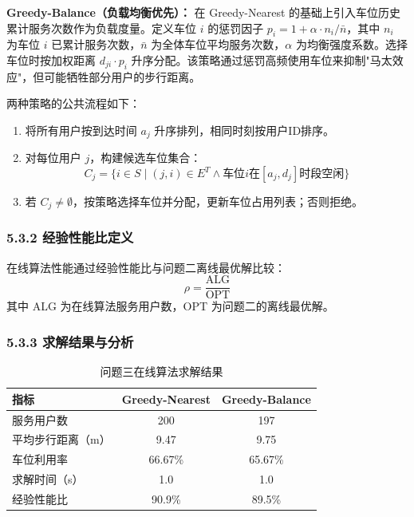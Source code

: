 \documentclass{ctexart}
\begin{document}
\textbf{Greedy-Balance（负载均衡优先）：} 在 Greedy-Nearest 的基础上引入车位历史累计服务次数作为负载度量。定义车位 $i$ 的惩罚因子 $p_i = 1 + \alpha \cdot n_i / \bar{n}$，其中 $n_i$ 为车位 $i$ 已累计服务次数，$\bar{n}$ 为全体车位平均服务次数，$\alpha$ 为均衡强度系数。选择车位时按加权距离 $d_{ji} \cdot p_i$ 升序分配。该策略通过惩罚高频使用车位来抑制"马太效应"，但可能牺牲部分用户的步行距离。

两种策略的公共流程如下：

\begin{enumerate}
  \item 将所有用户按到达时间 $a_j$ 升序排列，相同时刻按用户ID排序。
  \item 对每位用户 $j$，构建候选车位集合：
        \begin{equation}
          C_j = \{i\in S \mid (j,i)\in E^T \wedge \text{车位} i \text{在} [a_j,d_j] \text{时段空闲}\} \label{eq:candidate}
        \end{equation}
  \item 若 $C_j \neq \emptyset$，按策略选择车位并分配，更新车位占用列表；否则拒绝。
\end{enumerate}

\subsubsection*{5.3.2 经验性能比定义}

在线算法性能通过经验性能比与问题二离线最优解比较：
\begin{equation}
  \rho = \frac{\text{ALG}}{\text{OPT}} \label{eq:ratio}
\end{equation}
其中 ALG 为在线算法服务用户数，OPT 为问题二的离线最优解。

\subsubsection*{5.3.3 求解结果与分析}

\begin{table}[H]
  \centering
  \caption{问题三在线算法求解结果}
  \label{tab:q3_result}
  \begin{tabular}{lcc}
    \toprule
    指标        & Greedy-Nearest & Greedy-Balance \\
    \midrule
    服务用户数     & 200            & 197            \\
    平均步行距离（m） & 9.47           & 9.75           \\
    车位利用率     & 66.67\%        & 65.67\%        \\
    求解时间（s）   & 1.0            & 1.0            \\
    经验性能比     & 90.9\%         & 89.5\%         \\
    \bottomrule
  \end{tabular}
\end{table}
\end{document}
